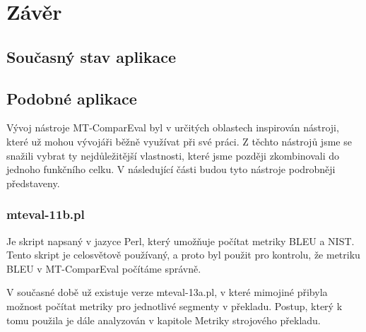 \chapter{Závěr}

\section{Současný stav aplikace}

\section{Podobné aplikace}
Vývoj nástroje MT-ComparEval byl v určitých oblastech inspirován nástroji,
  které už mohou vývojáři běžně využívat při své práci.
Z těchto nástrojů jsme se snažili vybrat ty nejdůležitější vlastnosti,
  které jsme později zkombinovali do jednoho funkčního celku.
V následující části budou tyto nástroje podrobněji představeny.

\subsection{mteval-11b.pl}
Je skript napsaný v jazyce Perl,
  který umožňuje počítat metriky BLEU a NIST.
Tento skript je celosvětově používaný,
  a proto byl použit pro kontrolu,
  že metriku BLEU v MT-ComparEval počítáme správně.

V současné době už existuje verze mteval-13a.pl,
  v které mimojiné přibyla možnost počítat metriky pro jednotlivé segmenty v překladu.
Postup, který k tomu použila je dále analyzován v kapitole Metriky strojového překladu.

